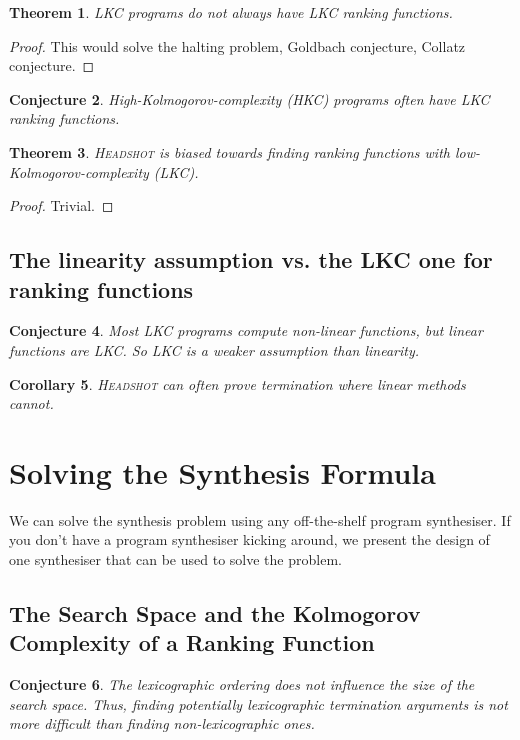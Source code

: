 \documentclass[preprint]{sigplanconf}
\newtheorem{theorem}{Theorem}
\newtheorem{corollary}[theorem]{Corollary}
\newtheorem{conjecture}[theorem]{Conjecture}
\theoremstyle{definition}
\begin{document}
\begin{theorem}
 LKC programs do not always have LKC ranking functions.
\end{theorem}

\begin{proof}
 This would solve the halting problem, Goldbach conjecture, Collatz conjecture.
\end{proof}

\begin{conjecture}
 High-Kolmogorov-complexity (HKC) programs often have LKC ranking functions.
\end{conjecture}

\begin{theorem}
 \textsc{Headshot} is biased towards finding ranking functions with
 low-Kolmogorov-complexity (LKC).
\end{theorem}

\begin{proof}
 Trivial.
\end{proof}

\subsection{The linearity assumption vs. the LKC one for ranking functions}

\begin{conjecture}
 Most LKC programs compute non-linear functions, but linear functions are LKC.
 So LKC is a weaker assumption than linearity.
\end{conjecture}

\begin{corollary}
 \textsc{Headshot} can often prove termination where linear methods cannot.
\end{corollary}
\fi

\section{Solving the Synthesis Formula}
We can solve the synthesis problem using any off-the-shelf program synthesiser.  If you don't
have a program synthesiser kicking around, we present the design of one synthesiser
that can be used to solve the problem.

\iffalse
\subsection{The Search Space and the Kolmogorov Complexity of a Ranking Function}
\begin{conjecture}
The lexicographic ordering does not influence the size of the search space. Thus, finding potentially lexicographic termination arguments is not more difficult than finding non-lexicographic ones.   
\end{conjecture}
\end{document}
